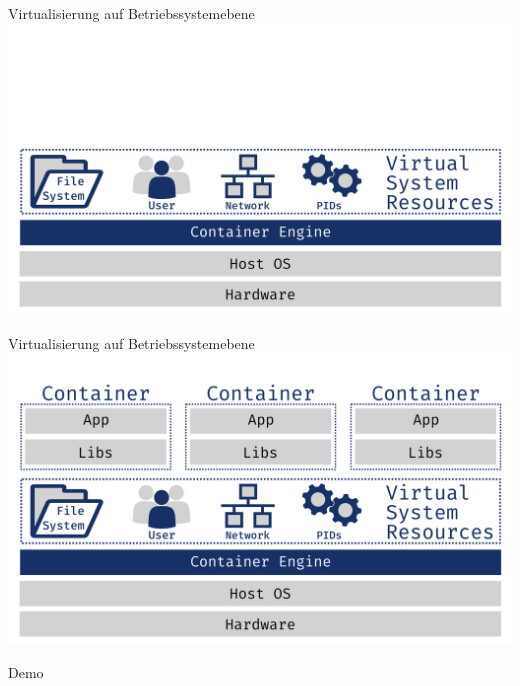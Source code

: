 \documentclass{beamer}
\begin{document}
  \begin{frame}{Virtualisierung auf Betriebssystemebene}
    \includegraphics[width=\textwidth]{os-virt}
  \end{frame}
  \begin{frame}{Virtualisierung auf Betriebssystemebene}
  	  \includegraphics[width=\textwidth]{container}
  \end{frame}
  \begin{frame}[standout]
    Demo
  \end{frame}
\end{document}
